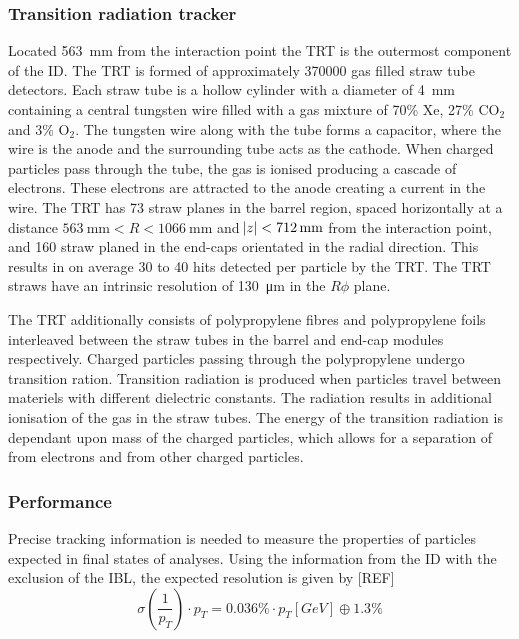 \subsubsection{Transition radiation tracker}
Located \SI{563}{\milli\meter} from the interaction point the TRT is the outermost component of the ID. The TRT is formed of approximately 370000 gas filled straw tube detectors. Each straw tube is a hollow cylinder with a diameter of \SI{4}{\milli\meter} containing a central tungsten wire filled with a gas mixture of 70\% Xe, 27\% CO$_{2}$ and 3\% O$_{2}$. The tungsten wire along with the tube forms a capacitor, where the wire is the anode and the surrounding tube acts as the cathode. When charged particles pass through the tube, the gas is ionised producing a cascade of electrons. These electrons are attracted to the anode creating a current in the wire. The TRT has 73 straw planes in the barrel region, spaced horizontally at a distance $\SI{563}{\milli\meter} < R < \SI{1066}{\milli\meter}$ and $\abs{z} < \SI{712}{\milli\meter}$ from the interaction point, and 160 straw planed in the end-caps orientated in the radial direction. This results in on average 30 to 40 hits detected per particle by the TRT. The TRT straws have an intrinsic resolution of \SI{130}{\micro\meter} in the $R\phi$ plane. 

The TRT additionally consists of polypropylene fibres and polypropylene foils interleaved between the straw tubes in the barrel and end-cap modules respectively. Charged particles passing through the polypropylene undergo transition ration. Transition radiation is produced when particles travel between materiels with different dielectric constants. The radiation results in additional ionisation of the gas in the straw tubes. The energy of the transition radiation is dependant upon mass of the charged particles, which allows for a separation of from electrons and from other charged particles.  

\subsubsection{Performance}

Precise tracking information is needed to measure the properties of particles expected in final states of analyses. Using the information from the ID with the exclusion of the IBL, the expected resolution is given by [REF]
\begin{equation}
   \sigma(\frac{1}{p_{T}}) \cdot p_{T} = 0.036 \% \cdot p_{T}[GeV] \oplus 1.3 \%
\end{equation}

